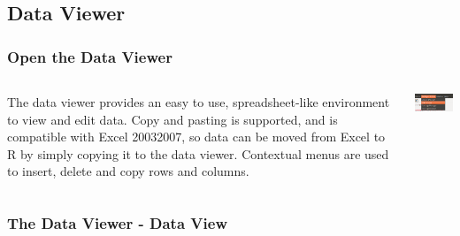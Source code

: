 \documentclass[xcolor={table},c]{beamer}
\begin{document}
 \subsection{Data Viewer}
 \begin{frame}\frametitle{Open the Data Viewer}
   \begin{columns}
     \begin{column}{0.5\textwidth}
   The data viewer provides an easy to use, spreadsheet-like environment to view and edit data. Copy and pasting is supported, and is compatible with Excel 2003\/2007, so data can be moved from Excel to R by simply copying it to the data viewer. Contextual menus are used to insert, delete and copy rows and columns.
 \end{column}
 \begin{column}{0.5\textwidth}
   \includegraphics[width=5cm]{dataviewer1.png}
 \end{column}
 \end{columns}
 \end{frame}

\begin{frame}\frametitle{The Data Viewer - Data View}
  \begin{center}
  \end{center}
\end{frame}
\end{document}
